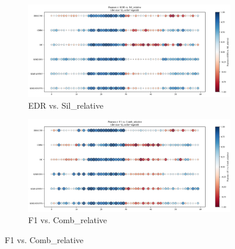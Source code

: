 \documentclass[10pt]{article} %
\numberwithin{equation}{section}
\begin{document}
\begin{enumerate}[label=(\alph*)]
\begin{figure}[htbp]
    \begin{subfigure}[b]{0.45\linewidth}
        \centering
        \includegraphics[width=\linewidth]{figures/point graph/dot_EDR_vs_Sil_relative_sorted.png}
        \caption{EDR vs. Sil\_relative}
        \label{fig:dot_edr_sil}
    \end{subfigure}
    \hfill
    \begin{subfigure}[b]{0.45\linewidth}
        \centering
        \includegraphics[width=\linewidth]{figures/point graph/dot_F1_vs_Comb_relative_sorted.png}
        \caption{F1 vs. Comb\_relative}
        \label{fig:dot_f1_comb}
    \end{subfigure}

    \vspace{1em}


\end{figure}
\end{enumerate}
\end{document}
